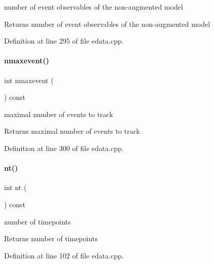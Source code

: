 number of event observables of the non-\/augmented model

\begin{DoxyReturn}{Returns}
number of event observables of the non-\/augmented model 
\end{DoxyReturn}


Definition at line 295 of file edata.\+cpp.

\mbox{\label{classamici_1_1_exp_data_ae6996d31ed94180a4b1d79412eb5ce31}} 
\paragraph{\texorpdfstring{nmaxevent()}{nmaxevent()}}
{\footnotesize\ttfamily int nmaxevent (\begin{DoxyParamCaption}{ }\end{DoxyParamCaption}) const}

maximal number of events to track

\begin{DoxyReturn}{Returns}
maximal number of events to track 
\end{DoxyReturn}


Definition at line 300 of file edata.\+cpp.

\mbox{\label{classamici_1_1_exp_data_a4c23d300cbe15b0afb1ee3731d47cc93}} 
\paragraph{\texorpdfstring{nt()}{nt()}}
{\footnotesize\ttfamily int nt (\begin{DoxyParamCaption}{ }\end{DoxyParamCaption}) const}

number of timepoints

\begin{DoxyReturn}{Returns}
number of timepoints 
\end{DoxyReturn}


Definition at line 102 of file edata.\+cpp.

